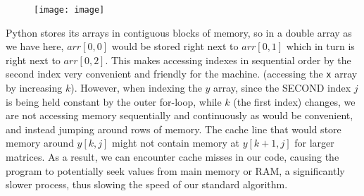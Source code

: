 \documentclass[11pt]{scrartcl}
\theoremstyle{dotlessP}
\theoremstyle{dotlessN}
\theoremstyle{dotN}
\begin{document}
\begin{figure}[H]
    \centering
    \texttt{[image: image]}
    \label{fig:enter-label}
\end{figure}


Python stores its arrays in contiguous blocks of memory, so in a double array as we have here, $arr[0, 0]$ would be stored right next to $arr[0, 1]$ which in turn is right next to $arr[0, 2]$. This makes accessing indexes in sequential order by the second index very convenient and friendly for the machine. (accessing the \texttt{x} array by increasing $k$). However, when indexing the $y$ array, since the SECOND index $j$ is being held constant by the outer for-loop, while $k$ (the first index) changes, we are not accessing memory sequentially and continuously as would be convenient, and instead jumping around rows of memory. The cache line that would store memory around $y[k, j]$ might not contain memory at $y[k+1, j]$ for larger matrices. As a result, we can encounter cache misses in our code, causing the program to potentially seek values from main memory or RAM, a significantly slower process, thus slowing the speed of our standard algorithm. 
\end{document}
